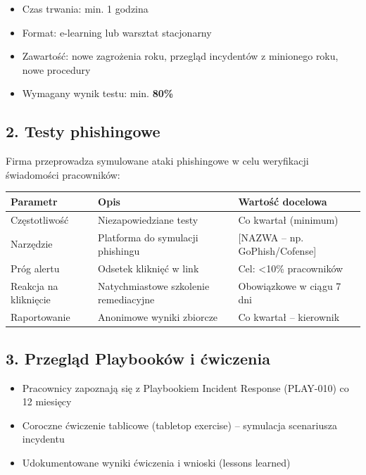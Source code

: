 \documentclass[12pt,a4paper]{article}
\providecommand{\tightlist}{\setlength{\itemsep}{0pt}\setlength{\parskip}{0pt}}
\begin{document}
\begin{itemize}
\tightlist
\item
  Czas trwania: min. 1 godzina
\item
  Format: e-learning lub warsztat stacjonarny
\item
  Zawartość: nowe zagrożenia roku, przegląd incydentów z minionego roku,
  nowe procedury
\item
  Wymagany wynik testu: min. \textbf{80\%}
\end{itemize}

\subsection{2. Testy phishingowe}\label{testy-phishingowe}

Firma przeprowadza symulowane ataki phishingowe w celu weryfikacji
świadomości pracowników:

\begin{longtable}[]{@{}>{\raggedright\arraybackslash}p{}>{\raggedright\arraybackslash}p{}>{\raggedright\arraybackslash}p{}@{}}
\toprule\noalign{}
Parametr & Opis & Wartość docelowa \\
\midrule\noalign{}
\endhead
\bottomrule\noalign{}
\endlastfoot
Częstotliwość & Niezapowiedziane testy & Co kwartał (minimum) \\
Narzędzie & Platforma do symulacji phishingu & {[}NAZWA -- np.
GoPhish/Cofense{]} \\
Próg alertu & Odsetek kliknięć w link & Cel: \textless10\%
pracowników \\
Reakcja na kliknięcie & Natychmiastowe szkolenie remediacyjne &
Obowiązkowe w ciągu 7 dni \\
Raportowanie & Anonimowe wyniki zbiorcze & Co kwartał -- kierownik \\
\end{longtable}

\subsection{3. Przegląd Playbooków i
ćwiczenia}\label{przeglux105d-playbookuxf3w-i-ux107wiczenia}

\begin{itemize}
\tightlist
\item
  Pracownicy zapoznają się z Playbookiem Incident Response (PLAY-010) co
  12 miesięcy
\item
  Coroczne ćwiczenie tablicowe (tabletop exercise) -- symulacja
  scenariusza incydentu
\item
  Udokumentowane wyniki ćwiczenia i wnioski (lessons learned)
\end{itemize}
\end{document}
